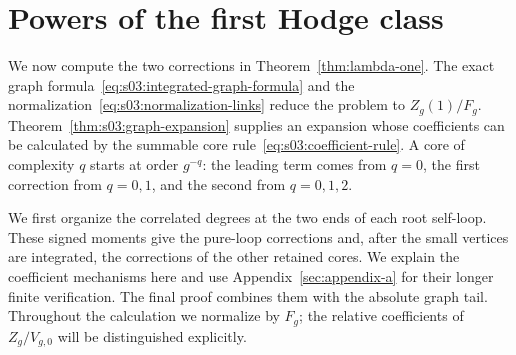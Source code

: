 \section{Powers of the first Hodge class}
\label{sec:s04}

We now compute the two corrections in Theorem~\ref{thm:lambda-one}.
The exact graph formula~\eqref{eq:s03:integrated-graph-formula} and
the normalization~\eqref{eq:s03:normalization-links} reduce the problem
to $Z_g(1)/F_g$. Theorem~\ref{thm:s03:graph-expansion} supplies an
expansion whose coefficients can be calculated by the summable core
rule~\eqref{eq:s03:coefficient-rule}. A core of complexity $q$ starts
at order $g^{-q}$: the leading term comes from $q=0$, the first
correction from $q=0,1$, and the second from $q=0,1,2$.

We first organize the correlated degrees at the two ends of each root
self-loop. These signed moments give the pure-loop corrections and,
after the small vertices are integrated, the corrections of the other
retained cores. We explain the coefficient mechanisms here and use
Appendix~\ref{sec:appendix-a} for their longer finite verification.
The final proof combines them with the absolute graph tail. Throughout
the calculation we normalize by $F_g$; the relative coefficients of
$Z_g/V_{g,0}$ will be distinguished explicitly.





